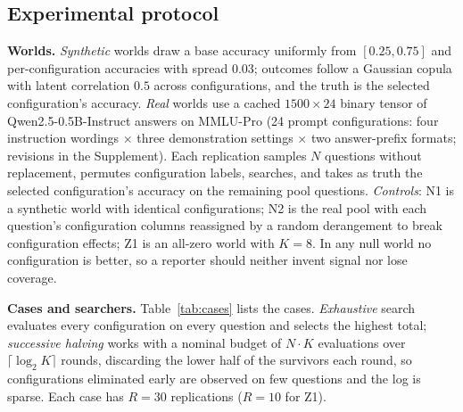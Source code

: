 \documentclass{article}
\begin{document}
\subsection{Experimental protocol}\label{sec:protocol}
\textbf{Worlds.} \emph{Synthetic} worlds draw a base accuracy uniformly from $[0.25,0.75]$ and per-configuration accuracies with spread $0.03$; outcomes follow a Gaussian copula with latent correlation $0.5$ across configurations, and the truth is the selected configuration's accuracy. \emph{Real} worlds use a cached $1500\times24$ binary tensor of Qwen2.5-0.5B-Instruct answers on MMLU-Pro (24 prompt configurations: four instruction wordings $\times$ three demonstration settings $\times$ two answer-prefix formats; revisions in the Supplement). Each replication samples $N$ questions without replacement, permutes configuration labels, searches, and takes as truth the selected configuration's accuracy on the remaining pool questions. \emph{Controls}: N1 is a synthetic world with identical configurations; N2 is the real pool with each question's configuration columns reassigned by a random derangement to break configuration effects; Z1 is an all-zero world with $K=8$. In any null world no configuration is better, so a reporter should neither invent signal nor lose coverage.

\textbf{Cases and searchers.} Table~\ref{tab:cases} lists the cases. \emph{Exhaustive} search evaluates every configuration on every question and selects the highest total; \emph{successive halving} works with a nominal budget of $N\!\cdot\!K$ evaluations over $\lceil\log_2K\rceil$ rounds, discarding the lower half of the survivors each round, so configurations eliminated early are observed on few questions and the log is sparse. Each case has $R=30$ replications ($R=10$ for Z1).
\end{document}
